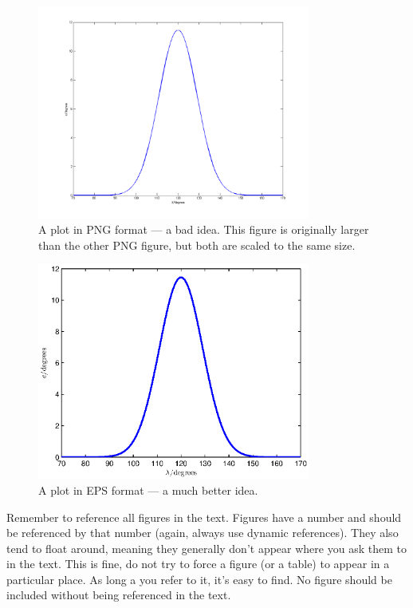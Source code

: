 \begin{figure}[htb]
	\centering
		\includegraphics[width=0.8\textwidth]{figures/template/constraint_png_large.png}
	\caption{A plot in PNG format --- a bad idea. This figure is originally larger than the other PNG figure, but both are scaled to the same size.}
\label{fig:constraint_png_large}
\end{figure}

\begin{figure}[htb]
	\centering
		\includegraphics[width=0.8\textwidth]{figures/template/constraint_eps.eps}
	\caption{A plot in EPS format --- a much better idea.}
\label{fig:constraint_eps}
\end{figure}

Remember to reference all figures in the text. Figures have a number and should be referenced by that number (again, always use dynamic references). They also tend to float around, meaning they generally don't appear where you ask them to in the text. This is fine, do not try to force a figure (or a table) to appear in a particular place. As long a you refer to it, it's easy to find. No figure should be included without being referenced in the text.

